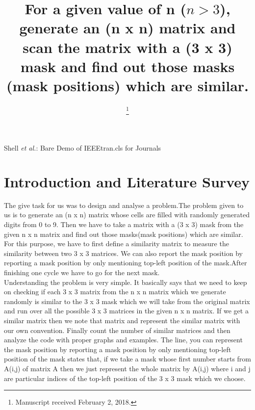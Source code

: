 \documentclass[conference]{IEEEtran}
\begin{document}
\title{For a given value of n ($n > 3 $), generate an (n x n) matrix and scan the matrix with a (3 x 3) mask and find out those masks (mask positions) which are similar.}

\author{
\and
{}
\and
{}
\and
{}
\thanks{Manuscript received February 2, 2018.}}

{Shell \MakeLowercase{\textit{et al.}}: Bare Demo of IEEEtran.cls for Journals}

\maketitle

\IEEEpeerreviewmaketitle

\section{\textbf{Introduction and Literature Survey}}
The give task for us was to design and analyse a problem.The problem given to us is to generate an (n x n) matrix whose cells are filled with randomly generated digits from 0 to 9. Then we have to take a matrix with a (3 x 3) mask from the given n x n matrix and find out those masks(mask positions) which are similar. For this purpose, we have to first define a similarity matrix to measure the similarity between two 3 x 3 matrices. We can also report the mask position by reporting a mask position by only mentioning top-left position of the mask.After finishing one cycle we have to go for the next mask.\\

Understanding the problem is very simple. It basically says that we need to keep on checking if each 3 x 3 matrix from the n x n matrix which we generate randomly is similar to the 3 x 3 mask which we will take from the original matrix and run over all the possible 3 x 3 matrices in the given n x n matrix. If we get a similar matrix then we note that matrix and represent the similar matrix with our own convention. Finally count the number of similar matrices and then analyze the code with proper graphs and examples. The line, you can represent the mask position by reporting a mask position by only mentioning top-left position of the mask states that, if we take a mask whose first number starts from A(i,j) of matrix A then we just represent the whole matrix by A(i,j) where i and j are particular indices of the top-left position of the 3 x 3 mask which we choose.   
\end{document}
